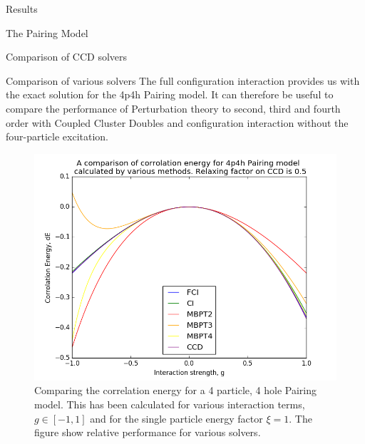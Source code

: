 \documentclass[twoside,english]{uiofysmaster}
\begin{document}
\begin{chapter}{Results}
\begin{section}{The Pairing Model}
\begin{subsection}{Comparison of CCD solvers}
		\end{subsection}
		\begin{subsection}{Comparison of various solvers}
			The full configuration interaction provides us with the exact solution for the 4p4h Pairing model. It can therefore be useful to compare the performance of Perturbation theory to second, third and fourth order with Coupled Cluster Doubles and configuration interaction without the four-particle excitation. 
			\begin{figure}[H]
				\includegraphics[width=\linewidth]{../Pairing_Model/Results/Figures/Pairing4p4h_CompareDE_AllMethods.png}
				\caption{Comparing the correlation energy for a 4 particle, 4 hole Pairing model. This has been calculated for various interaction terms, $g \in [-1,1]$ and for the single particle energy factor $\xi = 1$. The figure show relative performance for various solvers.}
				\label{figure:CompareCorrelationPairing}
			\end{figure}


\end{subsection}
\end{section}
\end{chapter}
\end{document}

